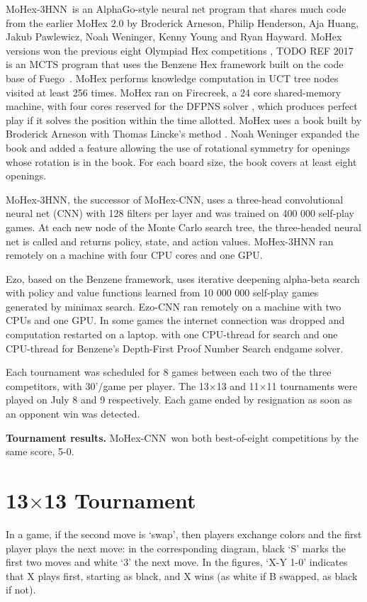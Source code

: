 \documentclass{IOS-Book-Article}
\def\Eo{\mbox{\sc Ezo}}
\def\Ec{\mbox{\sc Ezo-CNN}}
\def\Mx{\mbox{\sc MoHex}}
\def\Mc{\mbox{\sc MoHex-CNN}}
\def\Mt{\mbox{\sc MoHex-3HNN}}
\def\Fuego{\mbox{\sc Fuego}}
\begin{document}
\Mt\ is an AlphaGo-style neural net program that shares
much code from the earlier MoHex 2.0 by 
Broderick Arneson, Philip Henderson, Aja Huang, 
Jakub Pawlewicz, Noah Weninger, Kenny Young and Ryan Hayward.
MoHex versions
won the previous
eight Olympiad Hex competitions \cite{HAHP13},
TODO REF 2017
is an MCTS program that uses the Benzene Hex framework
built on the code base of \Fuego\ \cite{fuego}.
\Mx{} performs knowledge computation 
in UCT tree nodes visited at least 256 times.
\Mx{} ran on Firecreek, a 24 core shared-memory machine, 
with four cores reserved for the 
DFPNS solver \cite{PawlH13}, which
produces perfect play if it solves the
position within the time allotted.
\Mx{} uses a book built by Broderick Arneson with Thomas Lincke's method 
\cite{DBLP:conf/cg/Lincke00}. 
Noah Weninger expanded the book and added a feature
allowing the use of rotational symmetry for openings
whose rotation is in the book.
For each board size, the book covers at least eight openings.

\Mt{}, the successor of \Mc,
uses a three-head convolutional neural net (CNN)
with 128 filters per layer \cite{ijcai}
and was trained on 400 000 self-play games.
At each new node of the Monte Carlo search tree, 
the three-headed neural net is called
and returns policy, state, and action values.
\Mt{} ran remotely on a machine with four CPU cores and one GPU.

\Eo{}, based on the Benzene framework, 
uses iterative deepening alpha-beta search 
with policy and value functions
learned from 10 000 000 self-play games
generated by minimax search.
\Ec{} ran remotely on a machine
with two CPUs and one GPU.
In some games the internet connection was dropped
and computation restarted on a  laptop.
with one CPU-thread for search and one CPU-thread for
Benzene's Depth-First Proof Number Search endgame solver.

Each tournament was scheduled for 8 games between
each two of the three competitors, with 30'/game per player.
The 13$\times$13 and 11$\times$11 tournaments were played
on July 8 and 9 respectively.
Each game ended by resignation as soon as an opponent win was detected.

{\bf Tournament results.}
\Mc\ won both best-of-eight competitions by the same score, 5-0.

\section{13$\times$13 Tournament}
In a game, if the second move is `swap', then players
exchange colors and the first player plays the next move:
in the corresponding diagram, black `S' marks the first two moves
and white `3' the next move.
In the figures, `X-Y 1-0' indicates that X plays first, starting as black, 
and X wins (as white if B swapped, as black if not).
\end{document}

